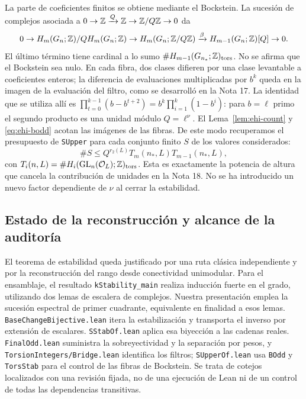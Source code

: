 La parte de coeficientes finitos se obtiene mediante el Bockstein. La sucesión de complejos asociada a $0\to\mathbb{Z}\xrightarrow{Q}\mathbb{Z}\to\mathbb{Z}/Q\mathbb{Z}\to0$ da
\begin{equation}
 0\to H_m(G_n;\mathbb{Z})/QH_m(G_n;\mathbb{Z})
 \to H_m(G_n;\mathbb{Z}/Q\mathbb{Z})
 \xrightarrow{\beta}H_{m-1}(G_n;\mathbb{Z})[Q]\to0.
 \label{eq:ehi-bock}
\end{equation}
El último término tiene cardinal a lo sumo $\# H_{m-1}(G_{n_*};\mathbb{Z})_{\rm tors}$. No se afirma que el Bockstein sea nulo. En cada fibra, dos clases difieren por una clase levantable a coeficientes enteros; la diferencia de evaluaciones multiplicadas por $b^k$ queda en la imagen de la evaluación del filtro, como se desarrolló en la Nota 17. La identidad que se utiliza allí es $\prod_{t=0}^{k-1}(b-b^{t+2})=b^k\prod_{i=1}^{k}(1-b^i)$: para $b=\ell$ primo el segundo producto es una unidad módulo $Q=\ell^\nu$. El Lema~\ref{lem:ehi-count} y \eqref{eq:ehi-bodd} acotan las imágenes de las fibras. De este modo recuperamos el presupuesto de \texttt{SUpper} para cada conjunto finito $S$ de los valores considerados:
\begin{equation}
 \#S\le Q^{r_2(L)} T_{m}(n_*,L)T_{m-1}(n_*,L),
 \label{eq:ehi-upper}
\end{equation}
con $T_i(n,L)=\#H_i(\operatorname{GL}_n(\mathcal O_L);\mathbb{Z})_{\rm tors}$. Esta es exactamente la potencia de altura que cancela la contribución de unidades en la Nota 18. No se ha introducido un nuevo factor dependiente de $\nu$ al cerrar la estabilidad.

\subsection{Estado de la reconstrucción y alcance de la auditoría}

El teorema de estabilidad queda justificado por una ruta clásica independiente y por la reconstrucción del rango desde conectividad unimodular. Para el ensamblaje, el resultado \texttt{kStability\_main} realiza inducción fuerte en el grado, utilizando dos lemas de escalera de complejos. Nuestra presentación emplea la sucesión espectral de primer cuadrante, equivalente en finalidad a esos lemas. \texttt{BaseChangeBijective.lean} itera la estabilización y transporta el inverso por extensión de escalares. \texttt{SStabOf.lean} aplica esa biyección a las cadenas reales. \texttt{FinalOdd.lean} suministra la sobreyectividad y la separación por pesos, y \texttt{TorsionIntegers/Bridge.lean} identifica los filtros; \texttt{SUpperOf.lean} usa \texttt{BOdd} y \texttt{TorsStab} para el control de las fibras de Bockstein. Se trata de cotejos localizados con una revisión fijada, no de una ejecución de Lean ni de un control de todas las dependencias transitivas.

